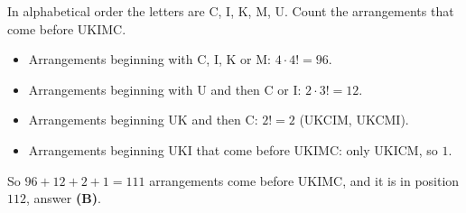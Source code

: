 In alphabetical order the letters are C, I, K, M, U. Count the arrangements that come before UKIMC.
\begin{itemize}
\item Arrangements beginning with C, I, K or M: $4\cdot4!=96$.
\item Arrangements beginning with U and then C or I: $2\cdot3!=12$.
\item Arrangements beginning UK and then C: $2!=2$ (UKCIM, UKCMI).
\item Arrangements beginning UKI that come before UKIMC: only UKICM, so $1$.
\end{itemize}
So $96+12+2+1=111$ arrangements come before UKIMC, and it is in position $\boxed{112}$, answer \textbf{(B)}.

